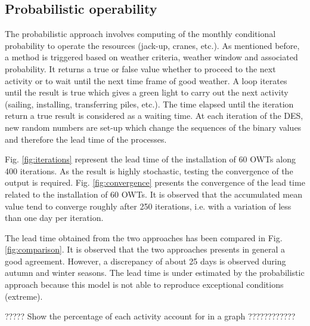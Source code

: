 \subsection{Probabilistic operability}
The probabilistic approach involves computing of the monthly conditional probability to operate the resources (jack-up, cranes, etc.). As mentioned before, a method is triggered based on weather criteria, weather window and associated probability. It returns a true or false value whether to proceed to the next activity or to wait until the next time frame of good weather. A loop iterates until the result is true which gives a green light to carry out the next activity (sailing, installing, transferring piles, etc.). The time elapsed until the iteration return a true result is considered as a waiting time. At each iteration of the DES, new random numbers are set-up which change the sequences of the binary values and therefore the lead time of the processes.

Fig. \ref{fig:iterations} represent the lead time of the installation of 60 OWTs along 400 iterations. As the result is highly stochastic, testing the convergence of the output is required. Fig. \ref{fig:convergence} presents the convergence of the lead time related to the installation of 60 OWTs. It is observed that the accumulated mean value tend to converge roughly after 250 iterations, i.e. with a variation of less than one day per iteration.

The lead time obtained from the two approaches has been compared in Fig. \ref{fig:comparison}. It is observed that the two approaches presents in general a good agreement. However, a discrepancy of about 25 days is observed during autumn and winter seasons. The lead time is under estimated by the probabilistic approach because this model is not able to reproduce exceptional conditions (extreme).

????? Show the percentage of each activity account for in a graph ????????????